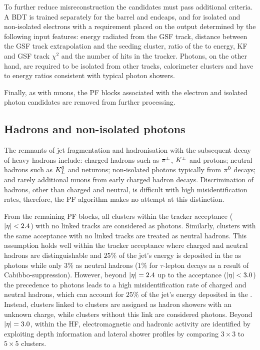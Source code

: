 To further reduce misreconstruction the candidates must pass additional
criteria. A BDT is trained separately for the barrel and endcaps, and for
isolated and non-isolated electrons with a requirement placed on the output
determined by the following input features: energy radiated from the GSF
track, distance between the GSF track extrapolation and the \ECAL seeding
cluster, ratio of the \HCAL to \ECAL energy, KF and GSF track $\chi^2$ and the
number of hits in the tracker. Photons, on the other hand, are required to be
isolated from other tracks, calorimeter clusters and have \HCAL to \ECAL
energy ratios consistent with typical photon showers.

Finally, as with muons, the PF blocks associated with the electron and
isolated photon candidates are removed from further processing.


\subsection{Hadrons and non-isolated photons}

The remnants of jet fragmentation and hadronisation with the subsequent decay
of heavy hadrons include: charged hadrons such as $\pi^{\pm}$, $K^{\pm}$ and
protons; neutral hadrons such as $K_L^{0}$ and neturons; non-isolated photons
typically from $\pi^{0}$ decays; and rarely additional muons from early
charged hadron decays. Discrimination of hadrons, other than charged and
neutral, is difficult with high misidentification rates, therefore, the PF
algorithm makes no attempt at this distinction.

From the remaining PF blocks, all \ECAL clusters within the tracker acceptance
(${|\eta|<2.4}$) with no linked tracks are considered as photons. Similarly,
\HCAL clusters with the same acceptance with no linked tracks are treated as
neutral hadrons. This assumption holds well within the tracker acceptance where
charged and neutral hadrons are distinguishable and $25\%$ of the jet's energy
is deposited in the \ECAL as photons while only $3\%$ as neutral hadrons
($1\%$ for $\tau$-lepton decays as a result of Cabibbo-suppression). However,
beyond ${|\eta|=2.4}$ up to the \ECAL acceptance (${|\eta|<3.0}$) the precedence
to photons leads to a high misidentification rate of charged and neutral
hadrons, which can account for $25\%$ of the jet's energy deposited in the
\ECAL. Instead, \ECAL clusters linked to \HCAL clusters are assigned as hadron
showers with an unknown charge, while \ECAL clusters without this link are
considered photons. Beyond ${|\eta|=3.0}$, within the HF, electromagnetic and
hadronic activity are identified by exploiting depth information and lateral
shower profiles by comparing $3\times 3$ to $5\times 5$ clusters.

